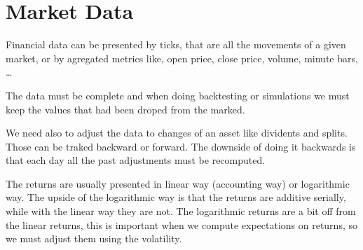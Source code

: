 \section{Market Data}

Financial data can be presented by ticks, that are all the movements of a given market,
or by agregated metrics like, open price, close price, volume, minute bars, \dots

The data must be complete and when doing backtesting or simulations we must keep the values that had been droped from the marked.

We need also to adjust the data to changes of an asset like dividents and splits.
Those can be traked backward or forward.
The downside of doing it backwards is that each day all the past adjustments must be recomputed.

The returns are usually presented in linear way (accounting way) or logarithmic way.
The upside of the logarithmic way is that the returns are additive serially, while with the linear way they are not.
The logarithmic returns are a bit off from the linear returns,
this is important when we compute expectations on returns, so we must adjust them using the volatility.

